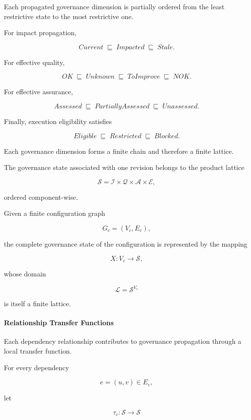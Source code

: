 \documentclass[10pt]{article}
\begin{document}
Each propagated governance dimension is partially ordered from the least
restrictive state to the most restrictive one.

For impact propagation,

\[
Current
\;\sqsubseteq\;
Impacted
\;\sqsubseteq\;
Stale.
\]

For effective quality,

\[
OK
\;\sqsubseteq\;
Unknown
\;\sqsubseteq\;
ToImprove
\;\sqsubseteq\;
NOK.
\]

For effective assurance,

\[
Assessed
\;\sqsubseteq\;
PartiallyAssessed
\;\sqsubseteq\;
Unassessed.
\]

Finally, execution eligibility satisfies

\[
Eligible
\;\sqsubseteq\;
Restricted
\;\sqsubseteq\;
Blocked.
\]

Each governance dimension forms a finite chain and therefore a finite lattice.

The governance state associated with one revision belongs to the product lattice

\[
\mathcal{S}
=
\mathcal{I}
\times
\mathcal{Q}
\times
\mathcal{A}
\times
\mathcal{E},
\]

ordered component-wise.

Given a finite configuration graph

\[
G_c=(V_c,E_c),
\]

the complete governance state of the configuration is represented by the
mapping

\[
X:V_c\rightarrow\mathcal{S},
\]

whose domain

\[
\mathcal{L}
=
\mathcal{S}^{V_c}
\]

is itself a finite lattice.


\paragraph{Relationship Transfer Functions}

Each dependency relationship contributes to governance propagation through a
local transfer function.

For every dependency

\[
e=(u,v)\in E_c,
\]

let

\[
\tau_e:
\mathcal{S}
\rightarrow
\mathcal{S}
\]
\end{document}
